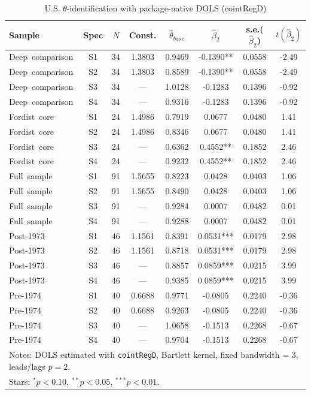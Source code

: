 \begin{table}[htbp]
\centering
\caption{U.S. $\theta$-identification with package-native DOLS (cointRegD)}
\label{tab:us_theta_cointreg}
\small
\begin{tabular}{l c c c c c c c}
\hline
Sample & Spec & $N$ & Const. & $\hat{\theta}_{base}$ & $\hat{\beta}_2$ & s.e.($\hat{\beta}_2$) & $t(\hat{\beta}_2)$ \\
\hline
Deep~comparison & S1 & 34 & 1.3803 & 0.9469 & -0.1390** & 0.0558 & -2.49 \\
Deep~comparison & S2 & 34 & 1.3803 & 0.8589 & -0.1390** & 0.0558 & -2.49 \\
Deep~comparison & S3 & 34 & --- & 1.0128 & -0.1283 & 0.1396 & -0.92 \\
Deep~comparison & S4 & 34 & --- & 0.9316 & -0.1283 & 0.1396 & -0.92 \\
Fordist~core & S1 & 24 & 1.4986 & 0.7919 & 0.0677 & 0.0480 & 1.41 \\
Fordist~core & S2 & 24 & 1.4986 & 0.8346 & 0.0677 & 0.0480 & 1.41 \\
Fordist~core & S3 & 24 & --- & 0.6362 & 0.4552** & 0.1852 & 2.46 \\
Fordist~core & S4 & 24 & --- & 0.9232 & 0.4552** & 0.1852 & 2.46 \\
Full~sample & S1 & 91 & 1.5655 & 0.8223 & 0.0428 & 0.0403 & 1.06 \\
Full~sample & S2 & 91 & 1.5655 & 0.8490 & 0.0428 & 0.0403 & 1.06 \\
Full~sample & S3 & 91 & --- & 0.9284 & 0.0007 & 0.0482 & 0.01 \\
Full~sample & S4 & 91 & --- & 0.9288 & 0.0007 & 0.0482 & 0.01 \\
Post-1973 & S1 & 46 & 1.1561 & 0.8391 & 0.0531*** & 0.0179 & 2.98 \\
Post-1973 & S2 & 46 & 1.1561 & 0.8718 & 0.0531*** & 0.0179 & 2.98 \\
Post-1973 & S3 & 46 & --- & 0.8857 & 0.0859*** & 0.0215 & 3.99 \\
Post-1973 & S4 & 46 & --- & 0.9385 & 0.0859*** & 0.0215 & 3.99 \\
Pre-1974 & S1 & 40 & 0.6688 & 0.9771 & -0.0805 & 0.2240 & -0.36 \\
Pre-1974 & S2 & 40 & 0.6688 & 0.9263 & -0.0805 & 0.2240 & -0.36 \\
Pre-1974 & S3 & 40 & --- & 1.0658 & -0.1513 & 0.2268 & -0.67 \\
Pre-1974 & S4 & 40 & --- & 0.9704 & -0.1513 & 0.2268 & -0.67 \\
\hline
\multicolumn{8}{l}{\footnotesize Notes: DOLS estimated with \texttt{cointRegD}, Bartlett kernel, fixed bandwidth = 3, leads/lags $p=2$.} \\
\multicolumn{8}{l}{\footnotesize Stars: $^{*}p<0.10$, $^{**}p<0.05$, $^{***}p<0.01$.} \\
\end{tabular}
\end{table}
